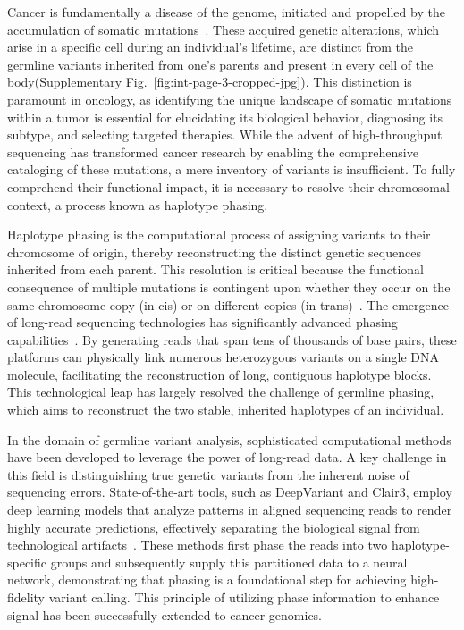 \documentclass[pdflatex,sn-nature]{sn-jnl}
\begin{document}
Cancer is fundamentally a disease of the genome, initiated and propelled by the accumulation of somatic mutations~\cite{vogelstein2013, stratton2009, vogelstein2004}. These acquired genetic alterations, which arise in a specific cell during an individual's lifetime, are distinct from the germline variants inherited from one's parents and present in every cell of the body(Supplementary Fig.~\ref{fig:int-page-3-cropped-jpg}). This distinction is paramount in oncology, as identifying the unique landscape of somatic mutations within a tumor is essential for elucidating its biological behavior, diagnosing its subtype, and selecting targeted therapies. While the advent of high-throughput sequencing has transformed cancer research by enabling the comprehensive cataloging of these mutations, a mere inventory of variants is insufficient. To fully comprehend their functional impact, it is necessary to resolve their chromosomal context, a process known as haplotype phasing.

Haplotype phasing is the computational process of assigning variants to their chromosome of origin, thereby reconstructing the distinct genetic sequences inherited from each parent. This resolution is critical because the functional consequence of multiple mutations is contingent upon whether they occur on the same chromosome copy (in cis) or on different copies (in trans)~\cite{garg2021, glusman2014}. The emergence of long-read sequencing technologies has significantly advanced phasing capabilities~\cite{warburton2023, maestri2020}. By generating reads that span tens of thousands of base pairs, these platforms can physically link numerous heterozygous variants on a single DNA molecule, facilitating the reconstruction of long, contiguous haplotype blocks. This technological leap has largely resolved the challenge of germline phasing, which aims to reconstruct the two stable, inherited haplotypes of an individual.

In the domain of germline variant analysis, sophisticated computational methods have been developed to leverage the power of long-read data. A key challenge in this field is distinguishing true genetic variants from the inherent noise of sequencing errors. State-of-the-art tools, such as DeepVariant and Clair3, employ deep learning models that analyze patterns in aligned sequencing reads to render highly accurate predictions, effectively separating the biological signal from technological artifacts~\cite{poplin2018, kolesnikov2023, zheng2022}. These methods first phase the reads into two haplotype-specific groups and subsequently supply this partitioned data to a neural network, demonstrating that phasing is a foundational step for achieving high-fidelity variant calling. This principle of utilizing phase information to enhance signal has been successfully extended to cancer genomics.
\end{document}
